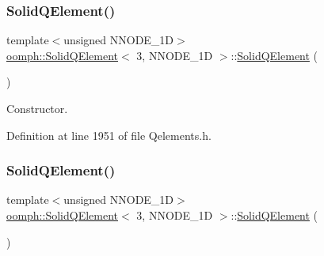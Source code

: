 \subsubsection{\texorpdfstring{Solid\+Q\+Element()}{SolidQElement()}\hspace{0.1cm}{\footnotesize\ttfamily [1/2]}}
{\footnotesize\ttfamily template$<$unsigned N\+N\+O\+D\+E\+\_\+1D$>$ \\
\hyperlink{classoomph_1_1SolidQElement}{oomph\+::\+Solid\+Q\+Element}$<$ 3, N\+N\+O\+D\+E\+\_\+1D $>$\+::\hyperlink{classoomph_1_1SolidQElement}{Solid\+Q\+Element} (\begin{DoxyParamCaption}{ }\end{DoxyParamCaption})\hspace{0.3cm}{\ttfamily [inline]}}



Constructor. 



Definition at line 1951 of file Qelements.\+h.

\mbox{\label{classoomph_1_1SolidQElement_3_013_00_01NNODE__1D_01_4_a302276129488b7607c1d40ce77b9b64a}} 
\subsubsection{\texorpdfstring{Solid\+Q\+Element()}{SolidQElement()}\hspace{0.1cm}{\footnotesize\ttfamily [2/2]}}
{\footnotesize\ttfamily template$<$unsigned N\+N\+O\+D\+E\+\_\+1D$>$ \\
\hyperlink{classoomph_1_1SolidQElement}{oomph\+::\+Solid\+Q\+Element}$<$ 3, N\+N\+O\+D\+E\+\_\+1D $>$\+::\hyperlink{classoomph_1_1SolidQElement}{Solid\+Q\+Element} (\begin{DoxyParamCaption}\item[{const \hyperlink{classoomph_1_1SolidQElement}{Solid\+Q\+Element}$<$ 3, N\+N\+O\+D\+E\+\_\+1D $>$ \&}]{ }\end{DoxyParamCaption})\hspace{0.3cm}{\ttfamily [inline]}}



